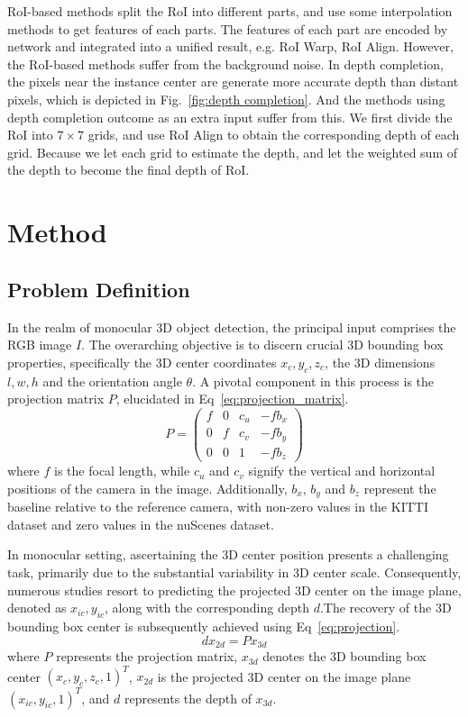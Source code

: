 \documentclass{article}
\begin{document}
RoI-based methods split the RoI into different parts, and use some interpolation methods to get features of each parts. The features of each part are encoded by network and integrated into a unified result, e.g. RoI Warp, RoI Align. However, the RoI-based methods suffer from the background noise. In depth completion, the pixels near the instance center are generate more accurate depth than distant pixels, which is depicted in Fig.~\ref{fig:depth completion}. And the methods using depth completion outcome as an extra input suffer from this. We first divide the RoI into $7\times 7$ grids, and use RoI Align to obtain the corresponding depth of each grid. Because we let each grid to estimate the depth, and let the weighted sum of the depth to become the final depth of RoI. 

\section{Method}
\subsection{Problem Definition}
In the realm of monocular 3D object detection, the principal input comprises the RGB image $I$. The overarching objective is to discern crucial 3D bounding box properties, specifically the 3D center coordinates $x_c, y_c, z_c$, the 3D dimensions $l, w, h$ and the orientation angle $\theta$. A pivotal component in this process is the projection matrix  $P$, elucidated in Eq~\eqref{eq:projection_matrix}.
\begin{equation}
P=\begin{pmatrix}f&0&c_u&-fb_x\\0&f&c_v&-fb_y\\0&0&1&-fb_z\end{pmatrix}
\label{eq:projection_matrix}
\end{equation}
where $f$ is the focal length, while $c_u$ and $c_v$ signify the vertical and horizontal positions of the camera in the image. Additionally, $b_x$, $b_y$ and $b_z$ represent the baseline relative to the reference camera, with non-zero values in the KITTI dataset and zero values in the nuScenes dataset.


In monocular setting, ascertaining the 3D center position presents a challenging task, primarily due to the substantial variability in 3D center scale. Consequently, numerous studies resort to predicting the projected 3D center on the image plane, denoted as $x_{ic}, y_{ic}$, along with the corresponding depth $d$.The recovery of the 3D bounding box center is subsequently achieved using Eq~\eqref{eq:projection}.
\begin{equation}
dx_{2d} = Px_{3d}
\label{eq:projection}
\end{equation}
where $P$ represents the projection matrix, $x_{3d}$ denotes the 3D bounding box center $(x_c, y_c, z_c, 1)^T$, $x_{2d}$ is the projected 3D center on the image plane $(x_{ic}, y_{ic}, 1)^T$, and $d$ represents the depth of $x_{3d}$.
\end{document}
